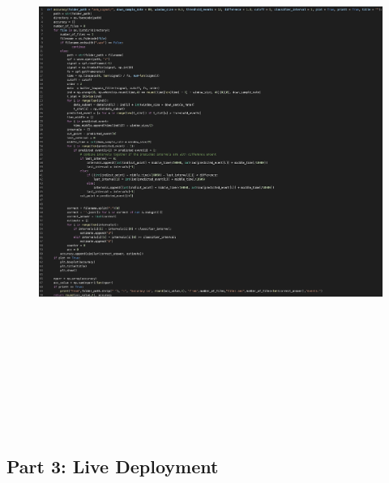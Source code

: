 \documentclass[oneside]{article}
\begin{document}
\begin{figure}[H]
  \centering
  \includegraphics[width = 17cm, height = 18cm]{Pictures/acc_cut.png}
  \end{figure}

\newpage

\subsection{Part 3: Live Deployment}
\end{document}
